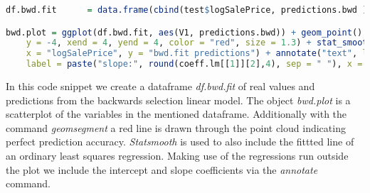 \begin{lstlisting}[language=R]
df.bwd.fit      = data.frame(cbind(test$logSalePrice, predictions.bwd ))  # creating dataframe containing real and predicted outcome

bwd.plot = ggplot(df.bwd.fit, aes(V1, predictions.bwd)) + geom_point() + geom_segment(x = -4, 
    y = -4, xend = 4, yend = 4, color = "red", size = 1.3) + stat_smooth(method = "lm", se = FALSE) + labs(title = "Backward selection linear model", 
    x = "logSalePrice", y = "bwd.fit predictions") + annotate("text", label = paste("int:", round(coeff.lm[[1]][1],4), sep = " "), x = -3, y = 3, size =10, color = "blue") + annotate("text", 
    label = paste("slope:", round(coeff.lm[[1]][2],4), sep = " "), x = -3, y = 2.5, size =10, color = "blue") + theme_classic(base_size = 20) 
\end{lstlisting} 
In this code snippet we create a dataframe \textit{df.bwd.fit} of real values and predictions from the backwards selection linear model. The object \textit{bwd.plot} is a scatterplot of the variables in the mentioned dataframe. Additionally with the command \textit{geomsegment} a red line is drawn through the point cloud indicating perfect prediction accuracy. \textit{Statsmooth} is used to also include the fittted line of an ordinary least squares regression. Making use of the regressions run outside the plot we include the intercept and slope coefficients via the \textit{annotate} command.   